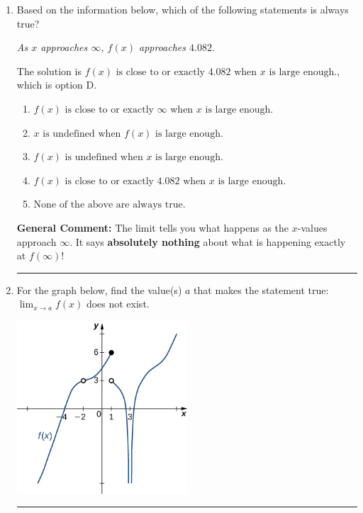 \documentclass{extbook}[14pt]
\newcommand{\litem}[1]{\item #1

\rule{\textwidth}{0.4pt}}
\begin{document}
\begin{enumerate}\litem{
Based on the information below, which of the following statements is always true?

\begin{center}
    \textit{ As $x$ approaches $\infty$, $f(x)$ approaches $4.082$. }
\end{center}
The solution is \( f(x) \text{ is close to or exactly } 4.082 \text{ when } x \text{ is large enough}. \), which is option D.\begin{enumerate}[label=\Alph*.]
\item \( f(x) \text{ is close to or exactly } \infty \text{ when } x \text{ is large enough}. \)


\item \( x \text{ is undefined when } f(x) \text{ is large enough}. \)


\item \( f(x) \text{ is undefined when } x \text{ is large enough}. \)


\item \( f(x) \text{ is close to or exactly } 4.082 \text{ when } x \text{ is large enough}. \)


\item \( \text{None of the above are always true.} \)


\end{enumerate}

\textbf{General Comment:} The limit tells you what happens as the $x$-values approach $\infty$. It says \textbf{absolutely nothing} about what is happening exactly at $f(\infty)$!
}
\litem{
For the graph below, find the value(s) $a$ that makes the statement true: $ \displaystyle \lim_{x \rightarrow a} f(x)$ does not exist.

\begin{center}
    \includegraphics[width=0.5\textwidth]{../Figures/evaluateLimitGraphicallyCopyB.png}
\end{center}


}
\end{enumerate}
\end{document}
